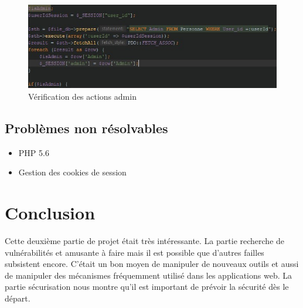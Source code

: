 \documentclass[12pt]{article}
\begin{document}
\begin{figure}[H]
\centering
\includegraphics[width=\linewidth]{images/ifSupressAdmin.jpg}
\caption{Vérification des actions admin}
\end{figure}
\subsection{Problèmes non résolvables}
\begin{itemize}
\item PHP 5.6
\item Gestion des cookies de session
\end{itemize}

\section{Conclusion}
Cette deuxième partie de projet était très intéressante. La partie recherche de vulnérabilités et amusante à faire mais il est possible que d'autres failles subsistent encore. C'était un bon moyen de manipuler de nouveaux outils et aussi de manipuler des mécanismes fréquemment utilisé dans les applications web. La partie sécurisation nous montre qu'il est important de prévoir la sécurité dès le départ.
\end{document}
